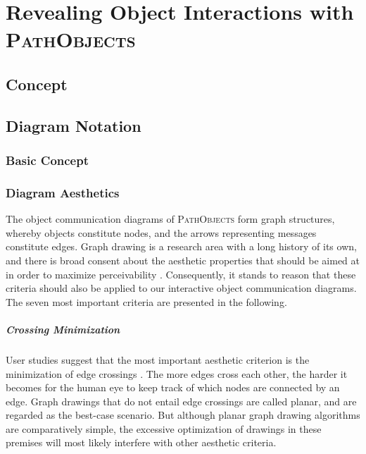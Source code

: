 \chapter{Revealing Object Interactions with \textsc{PathObjects}}
\label{c:approach}

\section{Concept}

\section{Diagram Notation}
\subsection{Basic Concept}
\subsection{Diagram Aesthetics}
The object communication diagrams of \textsc{PathObjects} form graph structures, whereby  objects constitute nodes, and the arrows representing messages constitute edges.
Graph drawing is a research area with a long history of its own, and there is broad consent about the aesthetic properties that should be aimed at in order to maximize perceivability \cite{battista_graph_1998, kaufmann_drawing_2001, diehl_software_2007}.
Consequently, it stands to reason that these criteria should also be applied to our interactive object communication diagrams.
The seven most important criteria are presented in the following.

\paragraph{Crossing Minimization} User studies suggest that the most important aesthetic criterion is the minimization of edge crossings \cite{purchase_effective_2000, purchase_graph_2004, purchase_graph_2010}.
The more edges cross each other, the harder it becomes for the human eye to keep track of which nodes are connected by an edge.
Graph drawings that do not entail edge crossings are called planar, and are regarded as the best-case scenario.
But although planar graph drawing algorithms are comparatively simple, the excessive optimization of drawings in these premises will most likely interfere with other aesthetic criteria.

